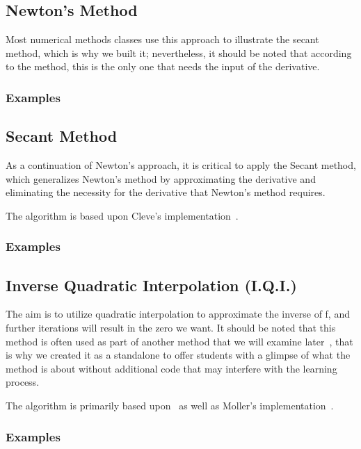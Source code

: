 \subsection{Newton's Method}
Most numerical methods classes use this approach to illustrate the secant method, which is why we built it; nevertheless, it should be noted that according to the method, this is the only one that needs the input of the derivative.
\subsubsection{Examples}
	


\subsection{Secant Method}
As a continuation of Newton's approach, it is critical to apply the Secant method, which generalizes Newton's method by approximating the derivative and eliminating the necessity for the derivative that Newton's method requires. 

The algorithm is based upon Cleve's implementation~\cite{doi:10.1137/1.9780898717952}.
\subsubsection{Examples}
	

\subsection{Inverse Quadratic Interpolation (I.Q.I.)}
The aim is to utilize quadratic interpolation to approximate the inverse of f, and further iterations will result in the zero we want. It should be noted that this method is often used as part of another method that we will examine later~\cite{10.5555/2553197}, that is why we created it as a standalone to offer students with a glimpse of what the method is about without additional code that may interfere with the learning process.

The algorithm is primarily based upon~\cite{kreyszig11}  as well as Moller's implementation~\cite{doi:10.1137/1.9780898717952}.
\subsubsection{Examples}
	



